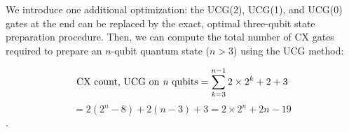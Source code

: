 \documentclass{article}
\begin{document}
We introduce one additional optimization: the UCG(2), UCG(1), and UCG(0) gates
at the end can be replaced by the exact, optimal three-qubit state preparation
procedure. Then, we can compute the total number of CX gates required to prepare
an $n$-qubit quantum state ($n > 3$) using the UCG method:

$$\text{CX count, UCG on \textit{n} qubits} = \sum_{k=3}^{n - 1}{2 \times 2^k + 2} + 3$$
$$ = 2(2^n - 8) + 2(n - 3) + 3 = 2 \times 2^n + 2n - 19$$.



\end{document}
